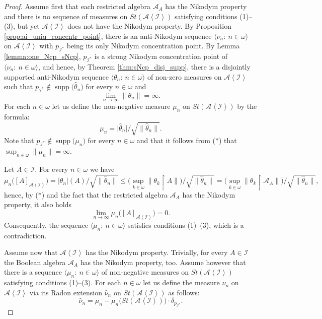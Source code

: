 \documentclass[a4paper,11pt,fleqn]{amsart}
\theoremstyle{definition}
\theoremstyle{remark}
\numberwithin{equation}{section}
\newcommand{\N}{\mathbb{N}}
\newcommand{\aA}{\mathcal{A}}
\newcommand{\iI}{\mathcal{I}}
\newcommand{\rstr}{\restriction}
\DeclareMathOperator{\supp}{supp}
\newcommand{\wh}{\widehat}
\newcommand{\seqn}[1]{\big\langle#1\colon\ n\io\big\rangle}
\newcommand{\gen}[1]{\mathopen{}\left\langle#1\mathclose{}\right\rangle}
\newcommand{\clopen}[1]{\left[#1\right]}
\newcommand{\io}{\in\omega}%
\begin{document}
\begin{proof}
Assume first that each restricted algebra $\aA_A$ has the Nikodym property and there is no sequence of measures on $St(\aA\gen{\iI})$ satisfying conditions (1)--(3), but yet $\aA\gen{\iI}$ does not have the Nikodym property. By Proposition \ref{prop:ai_uniq_concentr_point}, there is an anti-Nikodym sequence $\seqn{\nu_n}$ on $\aA\gen{\iI}$ with $p_{\iI^*}$ being its only Nikodym concentration point. By Lemma \ref{lemma:one_Ncp_sNcp}, $p_{\iI^*}$ is a strong Nikodym concentration point of $\seqn{\nu_n}$, and hence, by Theorem \ref{thm:sNcp_disj_supp}, there is a disjointly supported anti-Nikodym sequence $\seqn{\theta_n}$ of non-zero measures on $\aA\gen{\iI}$ such that $p_{\iI^*}\not\in\supp\big(\wh{\theta}_n\big)$ for every $n\io$ and%
\[\tag{$*$}\lim_{n\to\infty}\big\|\theta_n\big\|=\infty.\]
For each $n\io$ let us define the non-negative measure $\mu_n$ on $St(\aA\gen{\iI})$ by the formula:
\[\mu_n=\big|\wh{\theta}_n\big| \big/ \sqrt{\big\|\wh{\theta}_n\big\|}.\]
Note that $p_{\iI^*}\not\in\supp\big(\mu_n\big)$ for every $n\io$ and that it follows from ($*$) that $\sup_{n\io}\big\|\mu_n\big\|=\infty$. 

Let $A\in\iI$. For every $n\io$ we have
\[ \mu_n\big(\clopen{A}_{\aA\gen{\iI}}\big)=\big|\theta_n\big|(A)\big/{\sqrt{\big\|\wh{\theta}_n\big\|}}\leq \Big(\sup_{k\in\omega}\big\|\theta_k\rstr A\big\|\Big)\big/\sqrt{\big\|\wh{\theta}_n\big\|}=\Big(\sup_{k\in\omega}\big\|\theta_k\rstr \aA_A\big\|\Big)\big/\sqrt{\big\|\wh{\theta}_n\big\|},\]
hence, by ($*$) and the fact that the restricted algebra $\aA_A$ has the Nikodym property, it also holds
\[\lim_{n\to\infty}\mu_n\big(\clopen{A}_{\aA\gen{\iI}}\big)=0.\]
Consequently, the sequence $\seqn{\mu_n}$ satisfies conditions (1)--(3), which is a contradiction.

\medskip

Assume now that $\aA\gen{\iI}$ has the Nikodym property. Trivially, for every $A\in\iI$ the Boolean algebra $\aA_A$ has the Nikodym property, too. Assume however that there is a sequence $\seqn{\mu_n}$ of non-negative measures on $St(\aA\gen{\iI})$ satisfying conditions (1)--(3). For each $n\io$ let us define the measure $\nu_n$ on $\aA\gen{\iI}$ via its Radon extension $\wh{\nu}_n$ on $St(\aA\gen{\iI})$ as follows:
\[\wh{\nu}_n = \mu_n-\mu_n\big(St(\aA\gen{\iI})\big)\cdot\delta_{p_{\iI^*}}.\]


\end{proof}
\end{document}
